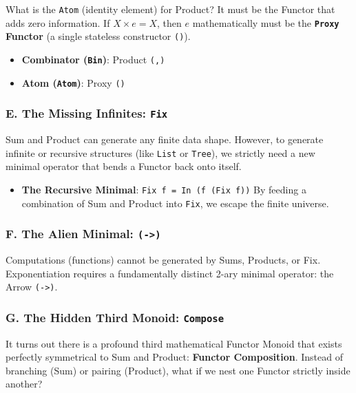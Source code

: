\documentclass[
]{article}
\providecommand{\tightlist}{%
  \setlength{\itemsep}{0pt}\setlength{\parskip}{0pt}}
\begin{document}
What is the \texttt{Atom} (identity element) for Product? It must be the
Functor that adds zero information. If \(X \times e = X\), then \(e\)
mathematically must be the \textbf{\texttt{Proxy} Functor} (a single
stateless constructor \texttt{()}).

\begin{itemize}
\tightlist
\item
  \textbf{Combinator (\texttt{Bin})}: Product \texttt{(,)}
\item
  \textbf{Atom (\texttt{Atom})}: Proxy \texttt{()}
\end{itemize}

\subsubsection{\texorpdfstring{E. The Missing Infinites:
\texttt{Fix}}{E. The Missing Infinites: Fix}}\label{e.-the-missing-infinites-fix}

Sum and Product can generate any finite data shape. However, to generate
infinite or recursive structures (like \texttt{List} or \texttt{Tree}),
we strictly need a new minimal operator that bends a Functor back onto
itself.

\begin{itemize}
\tightlist
\item
  \textbf{The Recursive Minimal}: \texttt{Fix\ f\ =\ In\ (f\ (Fix\ f))}
  By feeding a combination of Sum and Product into \texttt{Fix}, we
  escape the finite universe.
\end{itemize}

\subsubsection{\texorpdfstring{F. The Alien Minimal:
\texttt{(-\textgreater{})}}{F. The Alien Minimal: (-\textgreater)}}\label{f.-the-alien-minimal--}

Computations (functions) cannot be generated by Sums, Products, or Fix.
Exponentiation requires a fundamentally distinct 2-ary minimal operator:
the Arrow \texttt{(-\textgreater{})}.

\subsubsection{\texorpdfstring{G. The Hidden Third Monoid:
\texttt{Compose}}{G. The Hidden Third Monoid: Compose}}\label{g.-the-hidden-third-monoid-compose}

It turns out there is a profound third mathematical Functor Monoid that
exists perfectly symmetrical to Sum and Product: \textbf{Functor
Composition}. Instead of branching (Sum) or pairing (Product), what if
we nest one Functor strictly inside another?
\end{document}
